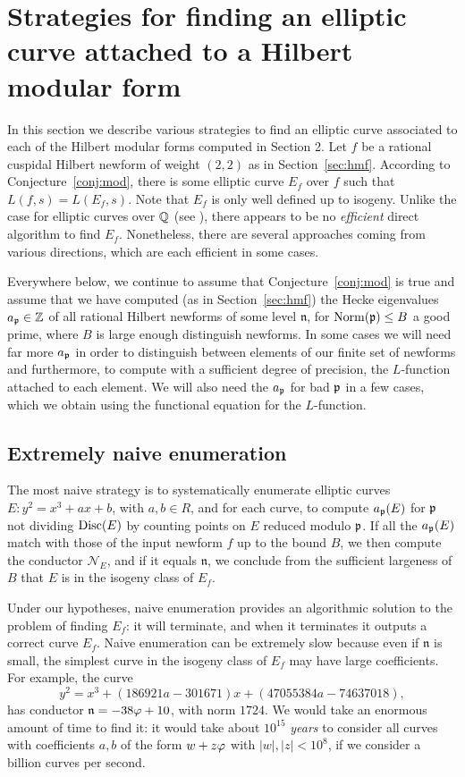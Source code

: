 \documentclass{amsart}
\newcommand{\n}{\mathfrak{n}}
\newcommand{\cN}{\mathcal{N}}
\begin{document}
\section{Strategies for finding an elliptic curve attached to a Hilbert modular form}\label{sec:finding}
In this section we describe various strategies to find an elliptic curve
 associated to each of the Hilbert modular forms computed in Section 2.
Let $f$ be a rational cuspidal Hilbert newform of weight $(2,2)$ as
in Section~\ref{sec:hmf}.  According to Conjecture~\ref{conj:mod},
there is some elliptic curve $E_f$ over $f$ such that $L(f,s) =
L(E_f,s)$.  Note that $E_f$ is only well defined up to isogeny.
Unlike the case for elliptic curves over $\mathbb{Q}$ (see \cite{cremona:algs}), 
there appears to be no {\em efficient} direct algorithm to find $E_f$.
 Nonetheless, there are several approaches coming from various directions, 
which are each efficient in some cases.

Everywhere below, we continue to assume that Conjecture~\ref{conj:mod}
is true and assume that we have computed (as in Section~\ref{sec:hmf})
the Hecke eigenvalues $a_{\mathfrak{p}}\in \mathbb{Z}$ of all rational Hilbert newforms of
some level $\n$, for $\operatorname{Norm}(\mathfrak{p})\leq B$ a good prime, where $B$ is
large enough distinguish newforms. In some cases we will need far more
$a_{\mathfrak{p}}$ in order to distinguish between elements of our finite set of
newforms and furthermore, to compute with a sufficient degree of
precision, the $L$-function attached to each element.  We will also
need the $a_{\mathfrak{p}}$ for  bad $\mathfrak{p}$ in a few cases, which we obtain
using the functional equation for the $L$-function.

\subsection{Extremely naive enumeration}\label{sec:naive}

The most naive strategy is to systematically enumerate 
 elliptic curves $E: y^2 = x^3 + ax + b$, with $a,b\in R$,
and for each curve, to compute $a_{\mathfrak{p}}(E)$ for $\mathfrak{p}$ not
dividing $\operatorname{Disc}(E)$ by counting points on $E$ reduced modulo $\mathfrak{p}$.  If
all the $a_{\mathfrak{p}}(E)$ match with those of the input newform $f$ up to the
bound $B$, we then compute the conductor $\cN_E$, and if it equals
$\n$, we conclude from the sufficient largeness of $B$ that $E$ is in
the isogeny class of $E_f$.

Under our hypotheses, naive enumeration provides an algorithmic
solution to the problem of finding $E_f$: it will terminate, and when
it terminates it outputs a correct curve $E_f$. Naive enumeration can
be extremely slow because even if $\n$ is small, the simplest curve in
the isogeny class of $E_f$ may have large coefficients.  For example,
the curve
$$y^2 = x^3 + \left(186921 a - 301671\right)x + \left(47055384 a -
74637018\right),
$$
has
conductor $\n = -38 \vphi + 10$, with norm $1724$.
We would take an enormous amount of time to find it: it
would take about $10^{15}$ {\em years} to consider all curves with
coefficients $a,b$ of the form $w+z\varphi$ with $|w|,|z| <10^8$, 
if we consider a billion curves per second.
\end{document}

